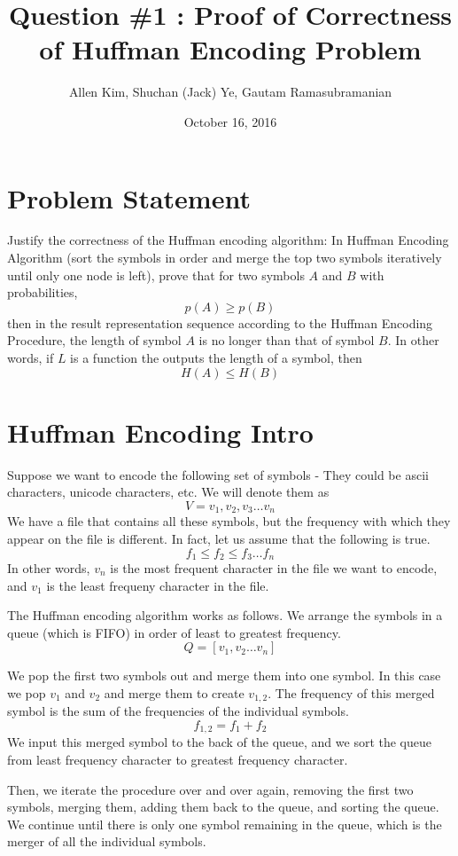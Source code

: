 \documentclass{article}
\title{Question \#1 : Proof of Correctness of Huffman Encoding Problem}
\author{Allen Kim, Shuchan (Jack) Ye, Gautam Ramasubramanian}
\date{October 16, 2016}
\begin{document}
\maketitle

\section*{Problem Statement}

Justify the correctness of the Huffman encoding algorithm: 
In Huffman Encoding Algorithm (sort the symbols in order and merge the top two symbols iteratively until only one node is left), 
prove that for two symbols $A$ and $B$ with probabilities,
$$
	p(A) \geq p(B)
$$ 
then in the result representation sequence according to the Huffman Encoding Procedure,
the length of symbol $A$ is no longer than that of symbol $B$. In other words, if $L$ is a function the outputs the length of a symbol, then
$$
	H(A) \leq H(B)
$$

\section*{Huffman Encoding Intro}

Suppose we want to encode the following set of symbols - They could be ascii characters, unicode characters, etc. We will denote them as
$$
V = {v_1, v_2, v_3 \ldots v_n}
$$
We have a file that contains all these symbols, but the frequency with which they appear on the file is different. In fact, let us assume that the following is true.
$$
f_1 \leq f_2 \leq f_3 \ldots f_n
$$ 
In other words, $v_n$ is the most frequent character in the file we want to encode, and $v_1$ is the least frequeny character in the file.

The Huffman encoding algorithm works as follows. We arrange the symbols in a queue (which is FIFO) in order of least to greatest frequency.
$$
Q = \left[ v_1, v_2 \ldots v_n \right]
$$ 

We pop the first two symbols out and merge them into one symbol. In this case we pop $v_1$ and $v_2$ and merge them to create $v_{1,2}$. The frequency of this merged symbol is the sum of the frequencies of the individual symbols.
$$
f_{1,2} = f_1 + f_2
$$
We input this merged symbol to the back of the queue, and we sort the queue from least frequency character to greatest frequency character.

Then, we iterate the procedure over and over again, removing the first two symbols, merging them, adding them back to the queue, and sorting the queue. We continue until there is only one symbol remaining in the queue, which is the merger of all the individual symbols.
\end{document}
